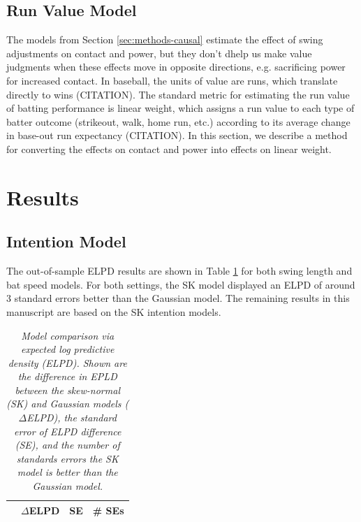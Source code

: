\documentclass{article}
\begin{document}
    \subsection{Run Value Model}
    \label{sec:methods-value}

      The models from Section \ref{sec:methods-causal} estimate the effect of swing adjustments on contact and power, but they don't dhelp us make value judgments when these effects move in opposite directions, e.g. sacrificing power for increased contact. In baseball, the units of value are runs, which translate directly to wins (CITATION). The standard metric for estimating the run value of batting performance is linear weight, which assigns a run value to each type of batter outcome (strikeout, walk, home run, etc.) according to its average change in base-out run expectancy (CITATION). In this section, we describe a method for converting the effects on contact and power into effects on linear weight.

  \section{Results}
  \label{sec:results}
  

    \subsection{Intention Model}
    \label{sec:results-intention}

    The out-of-sample ELPD results are shown in Table \ref{tab:intention-model-elpd} for both swing length and bat speed models. For both settings, the SK model displayed an ELPD of around 3 standard errors better than the Gaussian model. The remaining results in this manuscript are based on the SK intention models.

\begin{table}
        \centering
        \begin{tabular}{l|r|r|r|}
          & $\Delta$ELPD  & SE & \# SEs \\
          \hline
          
        \end{tabular}
        \caption{\it Model comparison via expected log predictive density (ELPD). Shown are the difference in EPLD between the skew-normal (SK) and Gaussian models ($\Delta$ELPD), the standard error of ELPD difference (SE), and the number of standards errors the SK model is better than the Gaussian model.}
        \label{tab:intention-model-elpd}
      \end{table}
\end{document}
